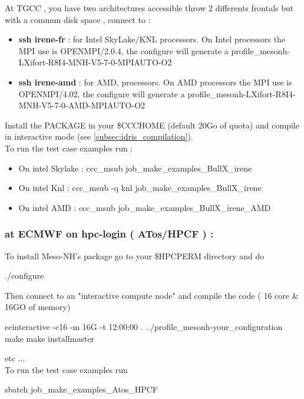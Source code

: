 At TGCC , you have two architectures accessible throw 2 differents frontals but with a commun disk space , connect to : 
\begin{itemize}
\item \textbf{ssh irene-fr} : for Intel SkyLake/KNL processors. On Intel processors the MPI use is OPENMPI/2.0.4, the configure will generate a profile\_mesonh-LXifort-R8I4-MNH-V5-7-0-MPIAUTO-O2
\item \textbf{ssh irene-amd} : for AMD, processors. On AMD processors the MPI use is OPENMPI/4.02, the configure  will generate a profile\_mesonh-LXifort-R8I4-MNH-V5-7-0-AMD-MPIAUTO-O2
\end{itemize}

Install the PACKAGE in your \$CCCHOME (default 20Go of quota) and compile in interactive mode (see \ref{subsec:idris_compilation}). \\

To run the test case examples  run :
\begin{itemize}
\item On intel Skylake : ccc\_msub job\_make\_examples\_BullX\_irene
\item On intel Knl : ccc\_msub -q knl job\_make\_examples\_BullX\_irene
\item On intel AMD : ccc\_msub job\_make\_examples\_BullX\_irene\_AMD
\end{itemize}

\subsubsection{at ECMWF on hpc-login ( ATos/HPCF ) :}

To install Meso-NH's package go to your \$HPCPERM directory and do
\begin{bashcode}
./configure
\end{bashcode}

Then connect to an "interactive compute node"  and compile the code ( 16 core & 16GO of memory)
\begin{bashcode}
ecinteractive -c16 -m 16G -t 12:00:00
. ../profile_mesonh-your_configuration
make
make installmaster
\end{bashcode}

etc ... \\

To run the test case examples  run
\begin{bashcode}
sbatch  job_make_examples_Atos_HPCF
\end{bashcode}

